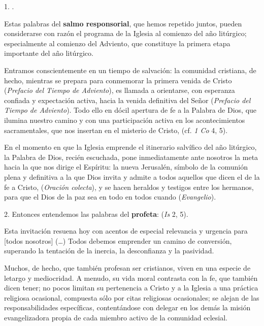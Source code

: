 			\begin{body}
				1. . 
				
				Estas palabras del \textbf{salmo responsorial}, que hemos repetido juntos, pueden considerarse con razón el programa de la Iglesia al comienzo del año litúrgico; especialmente al comienzo del Adviento, que constituye la primera etapa importante del año litúrgico. 
				
				Entramos conscientemente en un tiempo  de salvación: la comunidad cristiana, de hecho, mientras se prepara para conmemorar la primera venida de Cristo  (\emph{Prefacio del Tiempo de Adviento}), es llamada a orientarse, con esperanza confiada y expectación activa, hacia la venida definitiva del Señor  (\emph{Prefacio del Tiempo de Adviento}). Todo ello en dócil apertura de fe a la Palabra de Dios, que ilumina nuestro camino y con una participación activa en los acontecimientos sacramentales, que nos insertan en el misterio de Cristo,  (cf. \emph{1 Co} 4, 5). 
				
				En el momento en que la Iglesia emprende el itinerario salvífico del año litúrgico, la Palabra de Dios, recién escuchada, pone inmediatamente ante nosotros la meta hacia la que nos dirige el Espíritu: la nueva Jerusalén, símbolo de la comunión plena y definitiva a la que Dios invita y admite a todos aquellos que dicen el  de la fe a Cristo,  (\emph{Oración colecta}), y se hacen heraldos y testigos entre los hermanos, para que el Dios de la paz sea en todo en todos cuando  (\emph{Evangelio}). 
				
				2. Entonces entendemos las palabras del \textbf{profeta}:  (\emph{Is} 2, 5). 
				
				Esta invitación resuena hoy con acentos de especial relevancia y urgencia para {[}todos nosotros{]} (\ldots{}) Todos debemos emprender un camino de conversión, superando la tentación de la inercia, la desconfianza y la pasividad. 
				
				Muchos, de hecho, que también profesan ser cristianos, viven en una especie de letargo y mediocridad. A menudo, su vida moral contrasta con la fe, que también dicen tener; no pocos limitan su pertenencia a Cristo y a la Iglesia a una práctica religiosa ocasional, compuesta sólo por citas religiosas ocasionales; se alejan de las responsabilidades específicas, contentándose con delegar en los demás la misión evangelizadora propia de cada miembro activo de la comunidad eclesial. 
				

\end{body}
